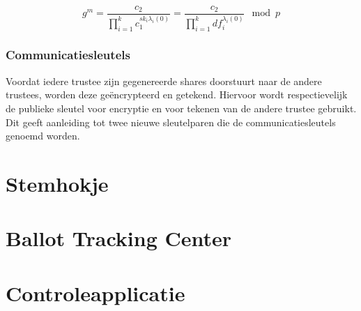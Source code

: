 \begin{equation}
  \label{eq:helios:threshold_encryption_m}
  g^m = \frac{c_2}{\prod_{i=1}^k{c_1^{{sk}_i\lambda_i(0)}}} = \frac{c_2}{\prod_{i=1}^k{{df}_i^{\lambda_i(0)}}} \mod{p}
\end{equation}


\subsubsection{Communicatiesleutels}
\label{sec:helios:communicatiesleutels}

Voordat iedere trustee zijn gegenereerde shares doorstuurt naar de andere trustees, worden deze ge\"encrypteerd en getekend. Hiervoor wordt respectievelijk de publieke sleutel voor encryptie en voor tekenen van de andere trustee gebruikt. Dit geeft aanleiding tot twee nieuwe sleutelparen die de communicatiesleutels genoemd worden.

\section{Stemhokje}
\label{sec:helios:stemhokje}



\section{Ballot Tracking Center}
\label{sec:helios:ballot_tracking_center}



\section{Controleapplicatie}
\label{sec:helios:controleapplicatie}


